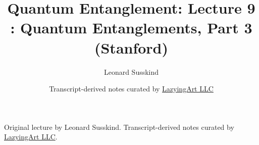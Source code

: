 \documentclass[11pt,oneside]{book}
\begin{document}
\frontmatter
\title{Quantum Entanglement: Lecture 9 : Quantum Entanglements, Part 3 (Stanford)}
\author{Leonard Susskind}
\date{Transcript-derived notes curated by \href{https://lazying.art}{LazyingArt LLC}}
\maketitle
\begin{center}
\small Original lecture by Leonard Susskind. Transcript-derived notes curated by \href{https://lazying.art}{LazyingArt LLC}.
\end{center}
\clearpage
\mainmatter

\end{document}
